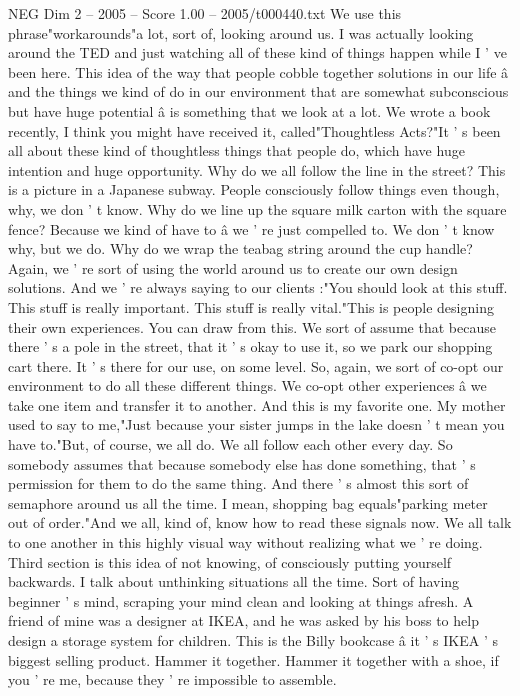 \begin{textsample}{NEG Dim 2 – 2005 – Score 1.00 – 2005/t000440.txt}
We use this phrase"workarounds"a lot, sort of, looking around us.
I was actually looking around the TED and just watching all of these kind of things happen while I ' ve been here.
This idea of the way that people cobble together solutions in our life â and the things we kind of do in our environment that are somewhat subconscious but have huge potential â is something that we look at a lot.
We wrote a book recently, I think you might have received it, called"Thoughtless Acts?"It ' s been all about these kind of thoughtless things that people do, which have huge intention and huge opportunity.
Why do we all follow the line in the street?
This is a picture in a Japanese subway.
People consciously follow things even though, why, we don ' t know.
Why do we line up the square milk carton with the square fence?
Because we kind of have to â we ' re just compelled to.
We don ' t know why, but we do.
Why do we wrap the teabag string around the cup handle?
Again, we ' re sort of using the world around us to create our own design solutions.
And we ' re always saying to our clients :"You should look at this stuff.
This stuff is really important.
This stuff is really vital."This is people designing their own experiences.
You can draw from this.
We sort of assume that because there ' s a pole in the street, that it ' s okay to use it, so we park our shopping cart there.
It ' s there for our use, on some level.
So, again, we sort of co-opt our environment to do all these different things.
We co-opt other experiences â we take one item and transfer it to another.
And this is my favorite one.
My mother used to say to me,"Just because your sister jumps in the lake doesn ' t mean you have to."But, of course, we all do.
We all follow each other every day.
So somebody assumes that because somebody else has done something, that ' s permission for them to do the same thing.
And there ' s almost this sort of semaphore around us all the time.
I mean, shopping bag equals"parking meter out of order."And we all, kind of, know how to read these signals now.
We all talk to one another in this highly visual way without realizing what we ' re doing.
Third section is this idea of not knowing, of consciously putting yourself backwards.
I talk about unthinking situations all the time.
Sort of having beginner ' s mind, scraping your mind clean and looking at things afresh.
A friend of mine was a designer at IKEA, and he was asked by his boss to help design a storage system for children.
This is the Billy bookcase â it ' s IKEA ' s biggest selling product.
Hammer it together.
Hammer it together with a shoe, if you ' re me, because they ' re impossible to assemble.

\end{textsample}

